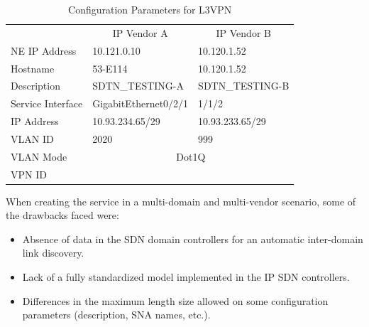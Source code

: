 \documentclass[a4paper,fleqn]{cas-dc}
\begin{document}
\begin{table}[]
\caption{Configuration Parameters for L3VPN}
\begin{adjustbox}{width=0.5\textwidth}
\small
\begin{tabular}{lll}
& \multicolumn{1}{c}{IP Vendor A} & \multicolumn{1}{c}{IP Vendor B} \\
{\color[HTML]{000000} NE IP Address} & {\color[HTML]{000000} 10.121.0.10}          & {\color[HTML]{000000} 10.120.1.52}     \\
\rowcolor[HTML]{F2F2F2} 
{\color[HTML]{000000} Hostname}            & {\color[HTML]{000000} 53-E114}              & {\color[HTML]{000000} 10.120.1.52}     \\
{\color[HTML]{000000} Description}         & {\color[HTML]{000000} SDTN\_TESTING-A}      & {\color[HTML]{000000} SDTN\_TESTING-B} \\
\rowcolor[HTML]{F2F2F2} 
{\color[HTML]{000000} Service   Interface} & {\color[HTML]{000000} GigabitEthernet0/2/1} & {\color[HTML]{000000} 1/1/2}           \\
{\color[HTML]{000000} IP Address}          & {\color[HTML]{000000} 10.93.234.65/29}      & {\color[HTML]{000000} 10.93.233.65/29} \\
\rowcolor[HTML]{F2F2F2} 
{\color[HTML]{000000} VLAN   ID}           & {\color[HTML]{000000} 2020}                 & {\color[HTML]{000000} 999}             \\
{\color[HTML]{000000} VLAN Mode}           & \multicolumn{2}{c}{{\color[HTML]{000000} Dot1Q}}                                     \\
\rowcolor[HTML]{F2F2F2} 
{\color[HTML]{000000} VPN   ID}            & \multicolumn{2}{c}{\cellcolor[HTML]{F2F2F2}{\color[HTML]{000000} 15}}           
\end{tabular}
\end{adjustbox}
\label{TAB:discovered_ip_l3vpn}
\end{table}

When creating the service in a multi-domain and multi-vendor scenario, some of the  drawbacks faced were: 
\begin{itemize}
    \item Absence of data in the SDN domain controllers for an automatic inter-domain link discovery.
    \item Lack of a fully standardized model implemented in the IP SDN controllers.
    \item Differences in the maximum length size allowed on some configuration parameters (description, SNA names, etc.).
\end{itemize}
\end{document}

